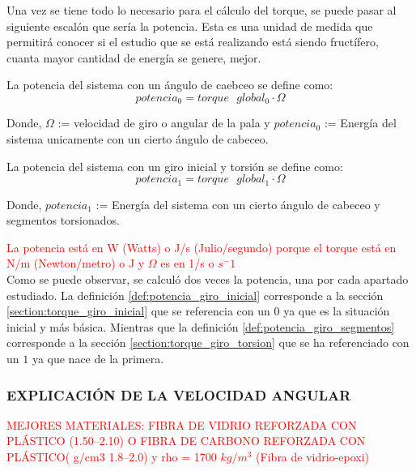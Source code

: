  Una vez se tiene todo lo necesario para el cálculo del torque, se puede pasar al siguiente escalón que sería la potencia. Esta es una unidad de medida que permitirá conocer si el estudio que se está realizando está siendo fructífero, cuanta mayor cantidad de energía se genere, mejor.
 
  \begin{definicion}
 La potencia del sistema con un ángulo de caebceo se define como:
 $$ potencia_0 = torque \text{ } global_0 \cdot \Omega $$ 
 
 Donde,
  \centering $\Omega$ := velocidad de giro o angular de la pala y $potencia_0$ := Energía del sistema unicamente con un cierto ángulo de cabeceo.
 \label{def:potencia_giro_inicial}
 \end{definicion}
 
   \begin{definicion}
 La potencia del sistema con un giro inicial y torsión se define como:
 $$ potencia_1 = torque \text{ } global_1 \cdot \Omega $$ 
 
 Donde,
 \centering $potencia_1$ := Energía del sistema con un cierto ángulo de cabeceo y segmentos torsionados.
 \label{def:potencia_giro_segmentos}
 \end{definicion}
 
 
 \textcolor{red}{La potencia está en W (Watts) o J/s (Julio/segundo) porque el torque está en N/m (Newton/metro) o J y $\Omega$ es en 1/s o $s^-1$} \\

 
 Como se puede observar, se calculó dos veces la potencia, una por cada apartado estudiado. La definición \ref{def:potencia_giro_inicial} corresponde a la sección \ref{section:torque_giro_inicial} que se referencia con un $0$ ya que es la situación inicial y más básica. Mientras que la definición \ref{def:potencia_giro_segmentos} corresponde a la sección \ref{section:torque_giro_torsion} que se ha referenciado con un $1$ ya que nace de la primera.
 
 
 
\subsubsection{EXPLICACIÓN DE LA VELOCIDAD ANGULAR}
 
 
\textcolor{red}{\Large{MEJORES MATERIALES: FIBRA DE VIDRIO REFORZADA CON PLÁSTICO (1.50–2.10) O FIBRA DE CARBONO REFORZADA CON PLÁSTICO( g/cm3	1.8–2.0) y rho = 1700 $kg/m^3$ (Fibra de vidrio-epoxi) }}
 
